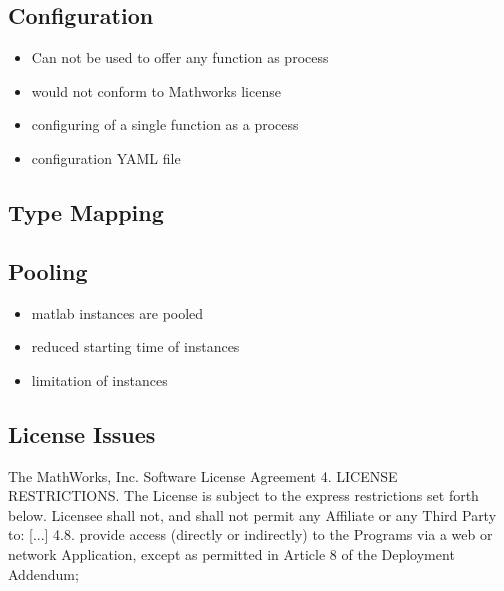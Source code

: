 	\subsection{Configuration}
	\begin{itemize}
		\item Can not be used to offer any function as process
		\item would not conform to Mathworks license
		\item configuring of a single function as a process
		\item configuration YAML file
	\end{itemize}


	\subsection{Type Mapping}

	\subsection{Pooling}
	\begin{itemize}
		\item matlab instances are pooled
		\item reduced starting time of instances
		\item limitation of instances
	\end{itemize}
	\subsection{License Issues}
		\begin{signedquote}{The MathWorks, Inc. Software License Agreement}
			4. LICENSE RESTRICTIONS.  The License is subject to the express restrictions
			set forth below. Licensee shall not, and shall not permit any Affiliate or any
			Third Party to:
				[...]
			    4.8. provide access (directly or indirectly) to the Programs via a web or
			    network Application, except as permitted in Article 8 of the Deployment
			    Addendum;
		\end{signedquote}

